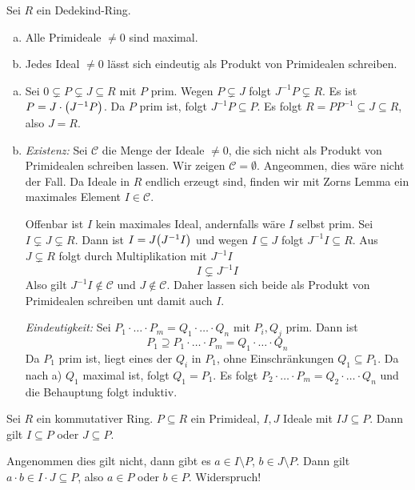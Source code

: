 \begin{satz}[label=satz:primfaktoren_ideale]
	Sei $R$ ein Dedekind-Ring.
	\begin{enumerate}[a)]
		\item Alle Primideale $\neq 0$ sind maximal.
		\item Jedes Ideal $\neq 0$ lässt sich eindeutig als Produkt von Primidealen schreiben.
	\end{enumerate}
\end{satz}
\begin{beweis}
	\begin{enumerate}[a)]
		\item Sei $0 \subsetneq P \subsetneq J \subseteq R$ mit $P$ prim.
		Wegen $P \subsetneq J$ folgt $J^{-1} P \subsetneq R$.
		Es ist $P = J \cdot \enbrace*{J^{-1} P}$.
		Da $P$ prim ist, folgt $J^{-1} P \subseteq P$.
		Es folgt $R= P P^{-1} \subseteq J \subseteq R$, also $J=R$.
		\item \emph{Existenz:} Sei $\mathcal{C}$ die Menge der Ideale $\neq 0$, die sich nicht als Produkt von Primidealen schreiben lassen.
		Wir zeigen $\mathcal{C}=\emptyset$.
		Angeommen, dies wäre nicht der Fall.
		Da Ideale in $R$ endlich erzeugt sind, finden wir mit Zorns Lemma ein maximales Element $I \in \mathcal{C}$.
		
		Offenbar ist $I$ kein maximales Ideal, andernfalls wäre $I$ selbst prim.
		Sei $I \subsetneq J \subsetneq R$.
		Dann ist $I =J \enbrace*{J^{-1} I}$ und wegen $I \subseteq J$ folgt $J^{-1} I \subseteq R$.
		Aus $J \subsetneq R$ folgt durch Multiplikation mit $J^{-1} I$
		\[
			I \subsetneq J^{-1}I
		\] 
		Also gilt $J^{-1} I \notin \mathcal{C}$ und $J \notin \mathcal{C}$.
		Daher lassen sich beide als Produkt von Primidealen schreiben unt damit auch $I$.
		
		\emph{Eindeutigkeit:} Sei $P_1 \cdot \ldots \cdot P_m = Q_1 \cdot \ldots \cdot Q_n$ mit $P_i, Q_j$ prim.
		Dann ist
		\[
			P_1 \supseteq P_1 \cdot \ldots \cdot P_m = Q_1 \cdot \ldots \cdot Q_n
		\]
		Da $P_1$ prim ist, liegt eines der $Q_i$ in $P_1$, ohne Einschränkungen $Q_1 \subseteq P_1$.
		Da nach a) $Q_1$ maximal ist, folgt $Q_1=P_1$.
		Es folgt $P_2 \cdot \ldots \cdot P_m = Q_2 \cdot \ldots \cdot Q_n$ und die Behauptung folgt induktiv.
		\qedhere
	\end{enumerate}
\end{beweis}

\begin{lemma}[label=lem:]
	Sei $R$ ein kommutativer Ring.
	$P \subseteq R$ ein Primideal, $I,J$ Ideale mit $I J  \subseteq P$.
	Dann gilt $I \subseteq P$ oder $J \subseteq P$.
\end{lemma}
\begin{beweis}
	Angenommen dies gilt nicht, dann gibt es $a \in  I\setminus P$, $b \in J \setminus P$.
	Dann gilt $a \cdot b \in I \cdot J \subseteq P$, also $a \in P$ oder $b \in P$. Widerspruch!
\end{beweis}


